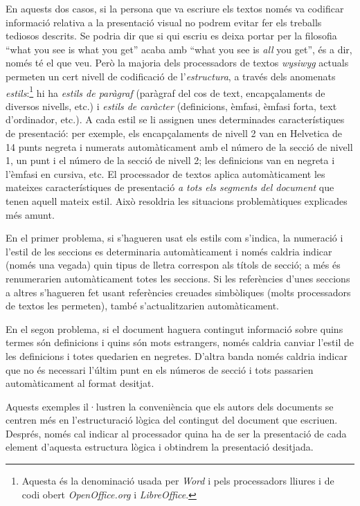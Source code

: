   En aquests dos casos, si la persona que va escriure els textos només
  va codificar informació relativa a la presentació visual no podrem
  evitar fer els treballs tediosos descrits. Se podria dir que si qui
  escriu es deixa portar per la filosofia ``what you see is what you
  get'' acaba amb ``what you see is \emph{all} you get'', és a dir,
  només té el que veu. Però la majoria dels processadors de textos
  \emph{wysiwyg} actuals permeten un cert nivell de codificació de
  l'\emph{estructura}, a través dels anomenats
  \emph{estils}:\footnote{Aquesta és la denominació usada per
    \emph{Word} i pels processadors lliures i de codi obert
    \emph{OpenOffice.org} i \emph{LibreOffice}.} hi ha \emph{estils de
    paràgraf} (paràgraf del cos de text, encapçalaments de diversos
  nivells, etc.) i \emph{estils de caràcter} (definicions, èmfasi,
  èmfasi forta, text d'ordinador, etc.).\label{pg:estil} A cada estil
  se li assignen unes determinades característiques de presentació:
  per exemple, els encapçalaments de nivell 2 van en Helvetica de 14
  punts negreta i numerats automàticament amb el número de la secció
  de nivell 1, un punt i el número de la secció de nivell 2; les
  definicions van en negreta i l'èmfasi en cursiva, etc. El
  processador de textos aplica automàticament les mateixes
  característiques de presentació \emph{a tots els segments del
    document} que tenen aquell mateix estil.  Això resoldria les
  situacions problemàtiques explicades més amunt.
  
  En el primer problema, si s'hagueren usat els estils com s'indica,
  la numeració i l'estil de les seccions es determinaria
  automàticament i només caldria indicar (només una vegada) quin tipus
  de lletra correspon als títols de secció; a més és renumerarien
  automàticament totes les seccions. Si les referències d'unes
  seccions a altres s'hagueren fet usant referències creuades
  simbòliques (molts processadors de textos les permeten), també
  s'actualitzarien automàticament.
  
  En el segon problema, si el document haguera contingut informació
  sobre quins termes són definicions i quins són mots estrangers,
  només caldria canviar l'estil de les definicions i totes quedarien
  en negretes. D'altra banda només caldria indicar que no és necessari
  l'últim punt en els números de secció i tots passarien
  automàticament al format desitjat.
  
  Aquests exemples il·lustren la conveniència que els autors dels
  documents se centren més en l'estructuració lògica del contingut del
  document que escriuen. Després, només cal indicar al processador
  quina ha de ser la presentació de cada element d'aquesta estructura
  lògica i obtindrem la presentació desitjada.


